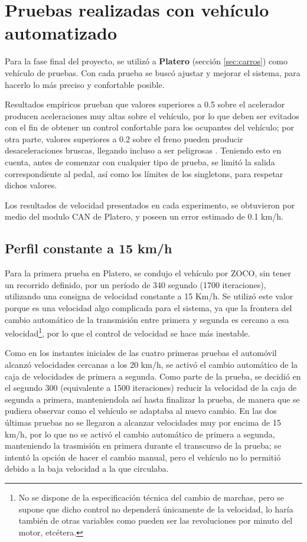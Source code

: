 \section{Pruebas realizadas con vehículo automatizado}
\label{sec:pCampo}

Para la fase final del proyecto, se utilizó a \textbf{Platero} (sección \ref{sec:carros}) como vehículo de pruebas. Con cada prueba se buscó ajustar y mejorar el sistema, para hacerlo lo más preciso y confortable posible.

Resultados empíricos prueban que valores superiores a 0.5 sobre el acelerador producen aceleraciones muy altas sobre el vehículo, por lo que deben ser evitados con el fin de obtener un control confortable para los ocupantes del vehículo; por otra parte, valores superiores a 0.2 sobre el freno pueden producir desaceleraciones bruscas, llegando incluso a ser peligrosas \cite{Milanes2010}. Teniendo esto en cuenta, antes de comenzar con cualquier tipo de prueba, se limitó la salida correspondiente al pedal, así como los límites de los singletons, para respetar dichos valores.

Los resultados de velocidad presentados en cada experimento, se obtuvieron por medio del modulo \gls{CAN} de Platero, y poseen un error estimado de 0.1 km/h. 

\subsection{Perfil constante a 15 km/h}
\label{subsec:p15}

Para la primera prueba en Platero, se condujo el vehículo por \gls{ZOCO}, sin tener un recorrido definido, por un período de 340 segundo (1700 iteraciones), utilizando una consigna de velocidad constante a 15 Km/h. Se utilizó este valor porque es una velocidad algo complicada para el sistema, ya que la frontera del cambio automático de la transmisión entre primera y segunda es cercano a esa velocidad\footnote{No se dispone de la especificación técnica del cambio de marchas, pero se supone que dicho control no dependerá únicamente de la velocidad, lo haría también de otras variables como pueden ser las revoluciones por minuto del motor, etcétera.}, por lo que el control de velocidad se hace más inestable.

Como en los instantes iniciales de las cuatro primeras pruebas el automóvil alcanzó velocidades cercanas a los 20 km/h, se activó el cambio automático de la caja de velocidades de primera a segunda. Como parte de la prueba, se decidió en el segundo 300 (equivalente a 1500 iteraciones) reducir la velocidad de la caja de segunda a primera, manteniendola así hasta finalizar la prueba, de manera que se pudiera observar como el vehículo se adaptaba al nuevo cambio. En las dos últimas pruebas no se llegaron a  alcanzar velocidades muy por encima de 15 km/h, por lo que no se activó el cambio automático de primera a segunda, manteniendo la trasmisión en primera durante el transcurso de la prueba; se intentó la opción de hacer el cambio manual, pero el vehículo no lo permitió debido a la baja velocidad a la que circulaba. 

